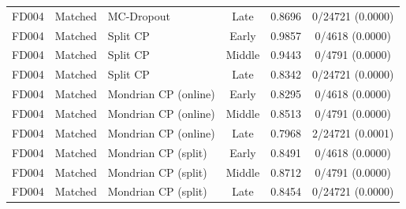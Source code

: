 \begin{table}[t]
\begin{tabular}{lllccc}
FD004 & Matched & MC-Dropout & Late & 0.8696 & 0/24721 (0.0000) \\
FD004 & Matched & Split CP & Early & 0.9857 & 0/4618 (0.0000) \\
FD004 & Matched & Split CP & Middle & 0.9443 & 0/4791 (0.0000) \\
FD004 & Matched & Split CP & Late & 0.8342 & 0/24721 (0.0000) \\
FD004 & Matched & Mondrian CP (online) & Early & 0.8295 & 0/4618 (0.0000) \\
FD004 & Matched & Mondrian CP (online) & Middle & 0.8513 & 0/4791 (0.0000) \\
FD004 & Matched & Mondrian CP (online) & Late & 0.7968 & 2/24721 (0.0001) \\
FD004 & Matched & Mondrian CP (split) & Early & 0.8491 & 0/4618 (0.0000) \\
FD004 & Matched & Mondrian CP (split) & Middle & 0.8712 & 0/4791 (0.0000) \\
FD004 & Matched & Mondrian CP (split) & Late & 0.8454 & 0/24721 (0.0000) \\
\bottomrule
\end{tabular}
\end{table}
